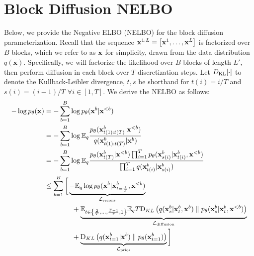 \documentclass{article} %
\begin{document}



\newpage

\appendix
\setcounter{tocdepth}{2}
\tableofcontents
\allowdisplaybreaks


\section{Block Diffusion NELBO}\label{suppl:diffusion-nelbo}
Below, we provide the Negative ELBO (NELBO) for the block diffusion parameterization. Recall that the sequence ${\mathbf x}^{1:L} = \left[ {\mathbf x}^1, \dots, {\mathbf x}^L \right]$ is factorized over $B$ blocks, which we refer to as ${\mathbf x}$ for simplicity, drawn from the data distribution $q(\mathbf{x})$. Specifically, we will factorize the likelihood over $B$ blocks of length $L'$, then perform diffusion in each block over $T$ discretization steps. Let $D_{\mathrm{KL}}[\cdot]$ to denote the Kullback-Leibler divergence, $t, s$ be shorthand for $t(i) = i / T$ and $s(i) = (i - 1)/T$ $\forall i \in [1, T]$. We derive the NELBO as follows:
\begin{align}\label{eq:nelbo-bd}
    - \log {p_\theta}({\mathbf x}) &= - \sum_{b = 1}^{B} \log {p_\theta}({\mathbf x}^{b} | {\mathbf x}^{<b}) \nonumber \\
    &=  - \sum_{b = 1}^{B} \log \mathbb{E}_{q} \frac{{p_\theta}({\mathbf x}^{b}_{t(1):t(T)} | {\mathbf x}^{<b})}{q({\mathbf x}^{b}_{t(1):t(T)} | {\mathbf x}^{b})} \nonumber \\
    &=  - \sum_{b = 1}^{B} \log \mathbb{E}_{q}   \frac{ {p_\theta}({\mathbf x}^{b}_{t(T)}| {\mathbf x}^{<b}) \prod_{i=1}^T {p_\theta}({\mathbf x}^{b}_{s(i)}| {\mathbf x}^{b}_{t(i)}, {\mathbf x}^{<b})}{ \prod_{i=1}^T q({\mathbf x}^{b}_{t(i)} | {\mathbf x}^{b}_{s(i)})} \nonumber \\
    &\leq \sum_{b = 1}^{B} \bigg[ \underbrace{- \mathbb{E}_{q} \log {p_\theta}({\mathbf x}^{b} | {\mathbf x}_{t = \frac{1}{T}}^{b}, {\mathbf x}^{<b})}_{\mathcal{L}_{\text{recons}}} \notag \\
    & \hspace{4em} + \underbrace{\mathbb{E}_{t \in \left\{ \frac{2}{T}, \dots, \frac{T - 1}{T}, 1 \right\}}  \mathbb{E}_{q} T  
      \text{D}_{KL}\left( q({\mathbf x}^{b}_{s} | {\mathbf x}^{b}_{t}, {\mathbf x}^{b}) \parallel 
      {p_\theta}({\mathbf x}^{b}_{s}| {\mathbf x}^{b}_{t}, {\mathbf x}^{<b})\right)}_{\mathcal{L}_{\text{diffusion}}} \notag \\
    & \hspace{4em} + \underbrace{\text{D}_{KL} \left( q({\mathbf x}^{b}_{t=1} | {\mathbf x}^{b}) \parallel {p_\theta}({\mathbf x}^{b}_{t=1}) \right)}_{\mathcal{L}_{\text{prior}}} \bigg ] 
\end{align}
\end{document}
